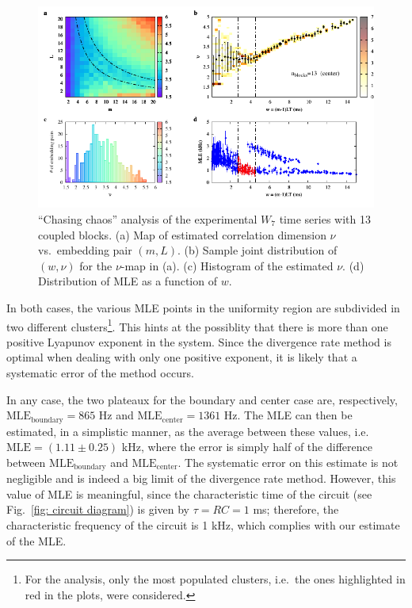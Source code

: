 \begin{figure}[!htbp]
    \centering
    \includegraphics[width=\linewidth]{../blocks/13_blocks/middle/2e5_points/plots/chaos_low.pdf}
    \caption{``Chasing chaos'' analysis of the experimental $W_7$ time series with 13 coupled blocks.
    (a) Map of estimated correlation dimension $\nu$ vs.\ embedding pair $(m, L)$.
    (b) Sample joint distribution of $(w,\nu)$ for the $\nu$-map in (a).
    (c) Histogram of the estimated $\nu$. (d) Distribution of MLE as a function of $w$.
    }\label{fig: 13 blocks chaos center}
\end{figure}

In both cases, the various MLE points in the uniformity region are subdivided in two different clusters\footnote{
For the analysis, only the most populated clusters, i.e.\ the ones highlighted in red in the plots,
were considered.}.
This hints at the possiblity that there is more than one positive Lyapunov exponent in the system.
Since the divergence rate method is optimal when dealing with only one positive exponent,
it is likely that a systematic error of the method occurs.

In any case, the two plateaux for the boundary and center case are, respectively,
$\text{MLE}_\text{boundary}=865$ Hz and $\text{MLE}_\text{center}=1361$ Hz.
The MLE can then be estimated, in a simplistic manner, as the average between
these values, i.e.\ $\text{MLE}=(1.11\pm0.25)$ kHz, where the error is simply half of the difference
between $\text{MLE}_\text{boundary}$ and $\text{MLE}_\text{center}$.
The systematic error on this estimate
is not negligible and is indeed a big limit of the divergence rate method.
However, this value of MLE is meaningful, since the characteristic time of the circuit
(see Fig.~\ref{fig: circuit diagram}) is given by $\tau=RC=1$ ms; therefore, the characteristic
frequency of the circuit is 1 kHz, which complies with our estimate of the MLE\@.






